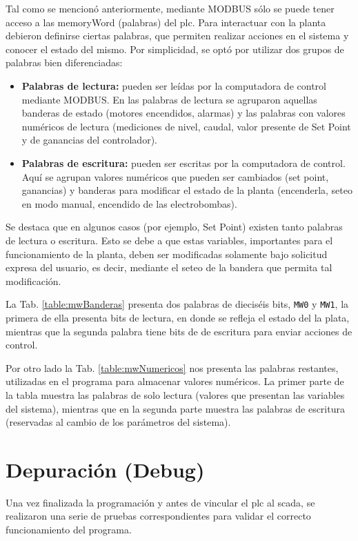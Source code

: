 Tal como se mencionó anteriormente, mediante MODBUS sólo se puede tener acceso 
a las \gls{memoryWord} (palabras) del \gls{plc}.
Para interactuar con la planta debieron definirse ciertas palabras, que
permiten realizar acciones en el sistema y conocer el estado del mismo.
Por simplicidad, se optó por utilizar dos grupos de palabras bien
diferenciadas:
\begin{itemize}
 \item \textbf{Palabras de lectura:} pueden ser leídas por la computadora de
control mediante MODBUS. En las palabras de lectura se agruparon aquellas
banderas de estado (motores encendidos, alarmas) y las palabras con valores
numéricos de lectura (mediciones de nivel, caudal, valor presente de Set Point
y de ganancias del controlador).
 \item \textbf{Palabras de escritura:} pueden ser escritas por la computadora
de control. Aquí se agrupan valores numéricos que pueden ser cambiados (set
point, ganancias) y banderas para modificar el estado de la planta (encenderla,
seteo en modo manual, encendido de las electrobombas).
\end{itemize}

Se destaca que en algunos casos (por ejemplo, Set Point) existen tanto palabras
de lectura o escritura.
Esto se debe a que estas variables, importantes para el funcionamiento de la
planta, deben ser modificadas solamente bajo solicitud expresa del usuario, es
decir, mediante el seteo de la bandera que permita tal modificación.

La Tab. \ref{table:mwBanderas} presenta dos palabras de dieciséis
bits, \verb|MW0| y \verb|MW1|, la primera de ella presenta bits de lectura, en
donde se
refleja el estado del la plata, mientras que la segunda palabra tiene bits de
de escritura para enviar acciones de control.

Por otro lado la Tab. \ref{table:mwNumericos} nos presenta
las palabras restantes, utilizadas en el programa para
almacenar valores numéricos.
La primer parte de la tabla muestra las palabras de solo lectura (valores que
presentan las variables del sistema), mientras que en la
segunda parte muestra las palabras de escritura (reservadas al cambio
de los parámetros del sistema).

\section{Depuración (Debug)}
\label{sec:Debug}

Una vez finalizada la programación y antes de vincular el \gls{plc}
al \gls{scada}, se realizaron una serie de pruebas correspondientes para
validar el correcto funcionamiento del programa.

